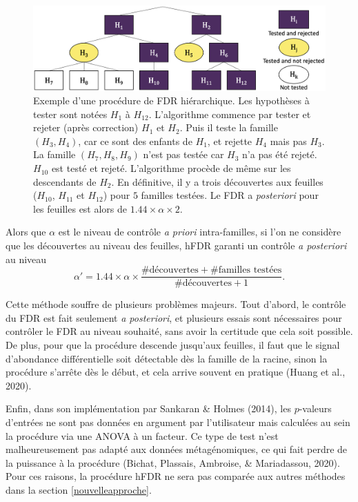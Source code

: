\documentclass[12pt,a4paper]{reedthesis}
\theoremstyle{definition}
\theoremstyle{definition}
\theoremstyle{definition}
\theoremstyle{remark}
\begin{document}
\begin{figure}

{\centering \includegraphics[width=0.9\linewidth]{img/hfdr} 

}

\caption{Exemple d'une procédure de FDR hiérarchique. Les hypothèses à tester sont notées \(H_1\) à \(H_{12}\). L'algorithme commence par tester et rejeter (après correction) \(H_1\) et \(H_2\). Puis il teste la famille \((H_3, H_4)\), car ce sont des enfants de \(H_1\), et rejette \(H_4\) mais pas \(H_3\). La famille \((H_7, H_8, H_9)\) n'est pas testée car \(H_3\) n'a pas été rejeté. \(H_{10}\) est testé et rejeté. L'algorithme procède de même sur les descendants de \(H_2\). En définitive, il y a trois découvertes aux feuilles (\(H_{10}\), \(H_{11}\) et \(H_{12}\)) pour \(5\) familles testées. Le FDR a \emph{posteriori} pour les feuilles est alors de \(1.44 \times \alpha \times 2\).}\label{fig:hfdr}
\end{figure}
Alors que \(\alpha\) est le niveau de contrôle \emph{a priori} intra-familles, si l'on ne considère que les découvertes au niveau des feuilles, hFDR garanti un contrôle \emph{a posteriori} au niveau
\begin{equation*}
\alpha' = 1.44 \times \alpha \times \frac{\# \text{découvertes} + \#\text{familles testées}}{\# \text{découvertes} + 1}.
\end{equation*}
\newline

Cette méthode souffre de plusieurs problèmes majeurs. Tout d'abord, le contrôle du FDR est fait seulement \emph{a posteriori}, et plusieurs essais sont nécessaires pour contrôler le FDR au niveau souhaité, sans avoir la certitude que cela soit possible.
De plus, pour que la procédure descende jusqu'aux feuilles, il faut que le signal d'abondance différentielle soit détectable dès la famille de la racine, sinon la procédure s'arrête dès le début, et cela arrive souvent en pratique (Huang et al., 2020).

Enfin, dans son implémentation par Sankaran \& Holmes (2014), les \(p\)-valeurs d'entrées ne sont pas données en argument par l'utilisateur mais calculées au sein la procédure via une ANOVA à un facteur. Ce type de test n'est malheureusement pas adapté aux données métagénomiques, ce qui fait perdre de la puissance à la procédure (Bichat, Plassais, Ambroise, \& Mariadassou, 2020). Pour ces raisons, la procédure hFDR ne sera pas comparée aux autres méthodes dans la section \ref{nouvelleapproche}.
\end{document}
